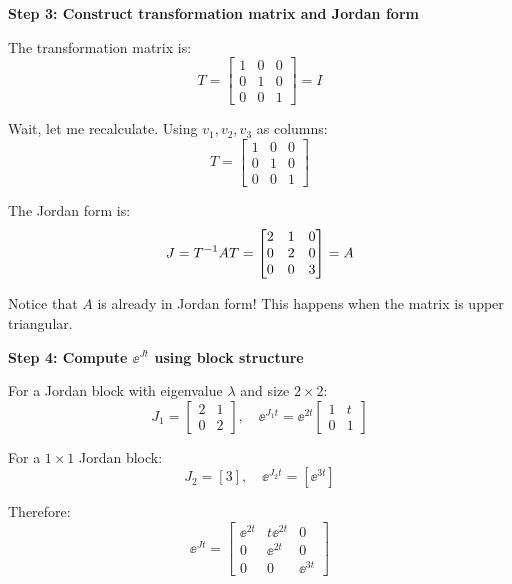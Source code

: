 \documentclass[11pt,a4paper]{article}
\begin{document}
\textbf{Step 3: Construct transformation matrix and Jordan form}

The transformation matrix is:
\begin{equation}
	T = \begin{bmatrix} 1 & 0 & 0 \\ 0 & 1 & 0 \\ 0 & 0 & 1 \end{bmatrix} = I
\end{equation}

Wait, let me recalculate. Using $v_1, v_2, v_3$ as columns:
\begin{equation}
	T = \begin{bmatrix} 1 & 0 & 0 \\ 0 & 1 & 0 \\ 0 & 0 & 1 \end{bmatrix}
\end{equation}

The Jordan form is:
\begin{equation}
	J = T^{-1} AT = \begin{bmatrix} 2 & 1 & 0 \\ 0 & 2 & 0 \\ 0 & 0 & 3 \end{bmatrix} = A
\end{equation}

Notice that $A$ is already in Jordan form! This happens when the matrix is upper triangular.

\textbf{Step 4: Compute $\ee^{Jt}$ using block structure}

For a Jordan block with eigenvalue $\lambda$ and size $2 \times 2$:
\begin{equation}
	J_1 = \begin{bmatrix} 2 & 1 \\ 0 & 2 \end{bmatrix}, \quad \ee^{J_1 t} = \ee^{2t}\begin{bmatrix} 1 & t \\ 0 & 1 \end{bmatrix}
\end{equation}

For a $1 \times 1$ Jordan block:
\begin{equation}
	J_2 = [3], \quad \ee^{J_2 t} = [\ee^{3t}]
\end{equation}

Therefore:
\begin{equation}
	\ee^{Jt} = \begin{bmatrix} \ee^{2t} & t\ee^{2t} & 0 \\ 0 & \ee^{2t} & 0 \\ 0 & 0 & \ee^{3t} \end{bmatrix}
\end{equation}
\end{document}
